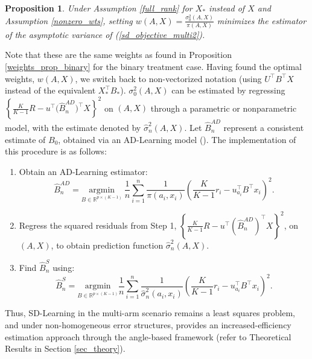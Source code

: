 \documentclass[useAMS,usenatbib]{biom}
\newtheorem{proposition}{Proposition} %
\begin{document}
\begin{proposition} \label{weights_prop_multi}
Under Assumption \ref{full_rank} for $X_*$ instead of $X$ and Assumption \ref{nonzero_wts}, setting $w(A,X) = \frac{\sigma_0^2(A,X)}{\pi(A,X)}$ minimizes the estimator of the asymptotic variance of (\ref{sd_objective_multi2}). 
\end{proposition}

Note that these are the same weights as found in Proposition \ref{weights_prop_binary} for the binary treatment case. Having found the optimal weights, $w(A,X)$, we switch back to non-vectorized notation (using $U^{\top}B^{\top}X$ instead of the equivalent $X_*^{\top} B_*$). $\sigma_0^2(A,X)$ can be estimated by regressing $\left\{\frac{K}{K-1}R - u^{\top} \big(\hat{B}_n^{AD}\big)^{\top} X  \right\}^2$ on $(A,X)$ through a parametric or nonparametric model, with the estimate denoted by  $\hat{\sigma}_n^2(A,X)$. Let $\hat{B}_n^{AD}$ represent a consistent estimate of $B_0$, obtained via an AD-Learning model (\cite{qi_multi-armed_2020}). The implementation of this procedure is as follows:

\begin{enumerate}
    \item Obtain an AD-Learning estimator:
    \begin{equation*}
        \hat{B}_n^{AD} = \underset{B \in \mathbb{R}^{p \times (K-1)}}{\mathrm{argmin}}\ \frac{1}{n} \sum_{i=1}^n \frac{1}{\pi(a_i, x_i)} \left(\frac{K}{K-1} r_i - u_{a_i}^{\top} B^{\top} x_i\right)^2.
    \end{equation*}
    \item Regress the squared residuals from Step 1, $\left\{ \frac{K}{K-1}R - u^{\top} \left(\hat{B}_n^{AD}\right)^{\top} X  \right\}^2$, on $(A,X)$, to obtain prediction function $\hat{\sigma}_n^2(A,X)$.
    \item Find $\hat{B}_n^S$ using:
    \begin{equation} \label{beta_sdlearning_multi}
    \hat{B}_n^S = \underset{B \in \mathbb{R}^{p \times (K-1)}}{\mathrm{argmin}} \frac{1}{n} \sum_{i=1}^{n} \frac{1}{\hat{\sigma}_n^2(a_i, x_i)} \left(\frac{K}{K-1} r_i - u_{a_i}^{\top} B^{\top} x_i \right)^2.
    \end{equation}
\end{enumerate}

Thus, SD-Learning in the multi-arm scenario remains a least squares problem, and under non-homogeneous error structures, provides an increased-efficiency estimation approach through the angle-based framework (refer to Theoretical Results in Section \ref{sec_theory}). 
\end{document}
